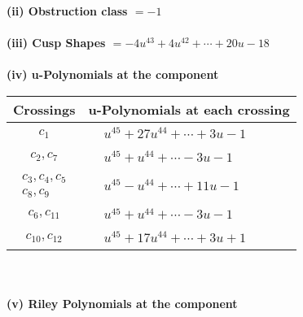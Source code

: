 \documentclass[1p]{elsarticle_modified}
\theoremstyle{definition}
\begin{document}
\flushleft \textbf{(ii) Obstruction class $= -1$}\\~\\
\flushleft \textbf{(iii) Cusp Shapes $= -4 u^{43}+4 u^{42}+\cdots+20 u-18$}\\~\\
\newpage\renewcommand{\arraystretch}{1}
\flushleft \textbf{(iv) u-Polynomials at the component}\newline \\
\begin{tabular}{m{50pt}|m{274pt}}
Crossings & \hspace{64pt}u-Polynomials at each crossing \\
\hline $$\begin{aligned}c_{1}\end{aligned}$$&$\begin{aligned}
&u^{45}+27 u^{44}+\cdots+3 u-1
\end{aligned}$\\
\hline $$\begin{aligned}c_{2},c_{7}\end{aligned}$$&$\begin{aligned}
&u^{45}+u^{44}+\cdots-3 u-1
\end{aligned}$\\
\hline $$\begin{aligned}c_{3},c_{4},c_{5}\\c_{8},c_{9}\end{aligned}$$&$\begin{aligned}
&u^{45}- u^{44}+\cdots+11 u-1
\end{aligned}$\\
\hline $$\begin{aligned}c_{6},c_{11}\end{aligned}$$&$\begin{aligned}
&u^{45}+u^{44}+\cdots-3 u-1
\end{aligned}$\\
\hline $$\begin{aligned}c_{10},c_{12}\end{aligned}$$&$\begin{aligned}
&u^{45}+17 u^{44}+\cdots+3 u+1
\end{aligned}$\\
\hline
\end{tabular}\\~\\
\newpage\renewcommand{\arraystretch}{1}
\flushleft \textbf{(v) Riley Polynomials at the component}\newline \\
\end{document}
